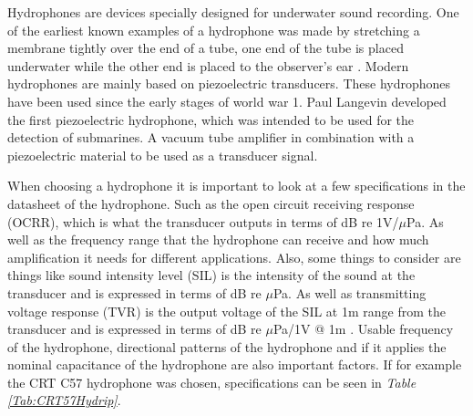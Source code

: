 Hydrophones are devices specially designed for underwater sound recording.
One of the earliest known examples of a hydrophone was made by stretching a membrane tightly over the end of a tube, one end of the tube is placed underwater while the other end is placed to the observer's ear \cite{wood_a_b_textbook_1946}. 
Modern hydrophones are mainly based on piezoelectric transducers.
These hydrophones have been used since the early stages of world war 1.
Paul Langevin developed the first piezoelectric hydrophone, which was intended to be used for the detection of submarines.
A vacuum tube amplifier in combination with a piezoelectric material to be used as a transducer signal\cite{van_der_kloot_great_2014}.

When choosing a hydrophone it is important to look at a few specifications in the datasheet of the hydrophone. 
Such as the open circuit receiving response (OCRR), which is what the transducer outputs in terms of dB re 1V/$\mu$Pa.
As well as the frequency range that the hydrophone can receive and how much amplification it needs for different applications.
Also, some things to consider are things like 
sound intensity level (SIL) is the intensity of the sound at the transducer and is expressed in terms of dB re $\mu$Pa.
As well as transmitting voltage response (TVR) is the output voltage of the SIL at 1m range from the transducer and is expressed in terms of dB re $\mu$Pa/1V @ 1m \cite{ethem_mutlu_sozer_underwater_nodate}. 
Usable frequency of the hydrophone, directional patterns of the hydrophone and if it applies the nominal capacitance of the hydrophone are also important factors. 
If for example the CRT C57 hydrophone was chosen, specifications can be seen in \textit{Table \ref{Tab:CRT57Hydrip}}.


